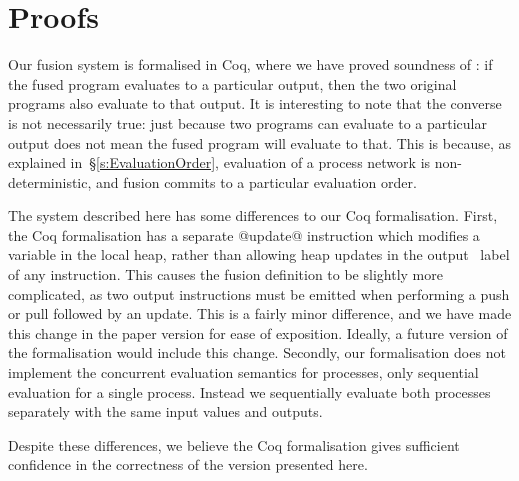 
\section{Proofs}
\label{s:Proofs}

Our fusion system is formalised in Coq, where we have proved soundness of : if the fused program evaluates to a particular output, then the two original programs also evaluate to that output.
It is interesting to note that the converse is not necessarily true: just because two programs can evaluate to a particular output does not mean the fused program will evaluate to that.
This is because, as explained in~\S\ref{s:EvaluationOrder}, evaluation of a process network is non-deterministic, and fusion commits to a particular evaluation order.

The system described here has some differences to our Coq formalisation.
First, the Coq formalisation has a separate @update@ instruction which modifies a variable in the local heap, rather than allowing heap updates in the output \Next~label of any instruction.
This causes the fusion definition to be slightly more complicated, as two output instructions must be emitted when performing a push or pull followed by an update.
This is a fairly minor difference, and we have made this change in the paper version for ease of exposition.
Ideally, a future version of the formalisation would include this change.
Secondly, our formalisation does not implement the concurrent evaluation semantics for processes, only sequential evaluation for a single process.
Instead we sequentially evaluate both processes separately with the same input values and outputs.

Despite these differences, we believe the Coq formalisation gives sufficient confidence in the correctness of the version presented here.

